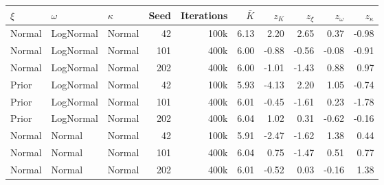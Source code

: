 \begin{tabular}{l l l r r r r r r r}
  \toprule
  $\xi$ & $\omega$ & $\kappa$ & Seed & Iterations & $\bar{K}$ & $z_K$ & $z_\xi$ & $z_\omega$ & $z_\kappa$ \\
  \midrule
  Normal & LogNormal & Normal & 42 & 100k & 6.13 & 2.20 & 2.65 & 0.37 & -0.98 \\
  Normal & LogNormal & Normal & 101 & 400k & 6.00 & -0.88 & -0.56 & -0.08 & -0.91 \\
  Normal & LogNormal & Normal & 202 & 400k & 6.00 & -1.01 & -1.43 & 0.88 & 0.97 \\
  \midrule
  Prior & LogNormal & Normal & 42 & 100k & 5.93 & -4.13 & 2.20 & 1.05 & -0.74 \\
  Prior & LogNormal & Normal & 101 & 400k & 6.01 & -0.45 & -1.61 & 0.23 & -1.78 \\
  Prior & LogNormal & Normal & 202 & 400k & 6.04 & 1.02 & 0.31 & -0.62 & -0.16 \\
  \midrule
  Normal & Normal & Normal & 42 & 100k & 5.91 & -2.47 & -1.62 & 1.38 & 0.44 \\
  Normal & Normal & Normal & 101 & 400k & 6.04 & 0.75 & -1.47 & 0.51 & 0.77 \\
  Normal & Normal & Normal & 202 & 400k & 6.01 & -0.52 & 0.03 & -0.16 & 1.38 \\
  \bottomrule
\end{tabular}
